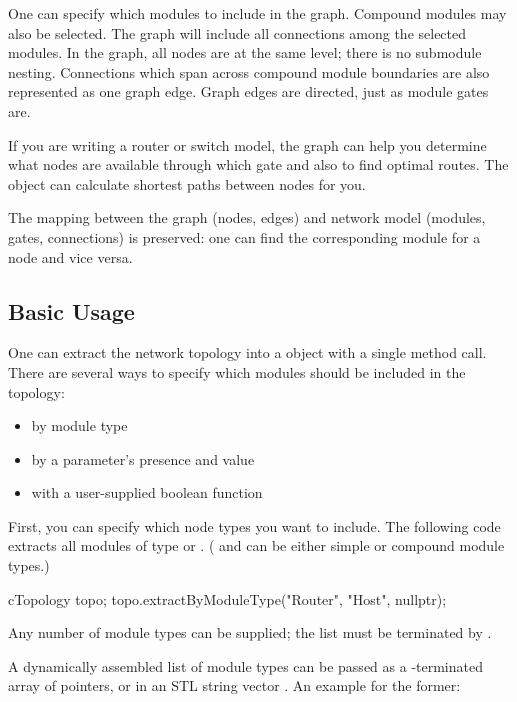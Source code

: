 One can specify which modules to include in the graph. Compound modules
may also be selected. The graph will include all connections among the
selected modules. In the graph, all nodes are at the same level;
there is no submodule nesting.  Connections which span across compound
module boundaries are also represented as one graph edge. Graph edges
are directed, just as module gates are.

If you are writing a router or switch model, the 
graph can help you determine what nodes are available through which
gate and also to find optimal routes. The
 object can calculate shortest paths between nodes for you.

The mapping between the graph (nodes, edges) and network model (modules,
gates, connections) is preserved: one can find the corresponding module for
a  node and vice versa.


\subsection{Basic Usage}
\label{sec:sim-lib:ctopology-basic-usage}

One can extract the network topology into a 
object with a single method call. There are several ways to specify
which modules should be included in the topology:

\begin{itemize}
  \item by module type
  \item by a parameter's presence and value
  \item with a user-supplied boolean function
\end{itemize}

First, you can specify which node types you want to include. The
following code extracts all modules of type  or .
( and  can be either simple or compound module types.)

\begin{cpp}
cTopology topo;
topo.extractByModuleType("Router", "Host", nullptr);
\end{cpp}

Any number of module types can be supplied; the list must be terminated by .

A dynamically assembled list of module types can be passed as a
-terminated array of  pointers, or
in an STL string vector .
An example for the former:

